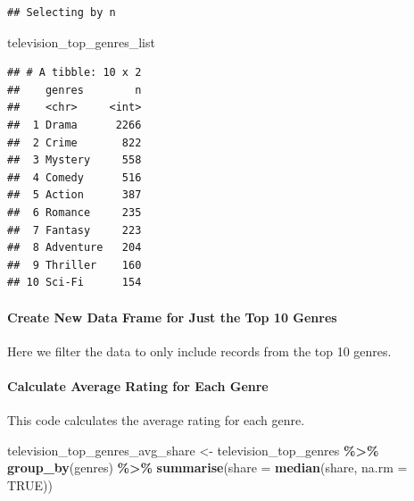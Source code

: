 \documentclass[
  b5paper]{book}
\newenvironment{Shaded}{\begin{snugshade}}{\end{snugshade}}
\newcommand{\AttributeTok}[1]{\textcolor[rgb]{0.13,0.29,0.53}{#1}}
\newcommand{\ConstantTok}[1]{\textcolor[rgb]{0.56,0.35,0.01}{#1}}
\newcommand{\FunctionTok}[1]{\textcolor[rgb]{0.13,0.29,0.53}{\textbf{#1}}}
\newcommand{\NormalTok}[1]{#1}
\newcommand{\OtherTok}[1]{\textcolor[rgb]{0.56,0.35,0.01}{#1}}
\newcommand{\SpecialCharTok}[1]{\textcolor[rgb]{0.81,0.36,0.00}{\textbf{#1}}}
\begin{document}
\begin{verbatim}
## Selecting by n
\end{verbatim}

\begin{Shaded}
\begin{Highlighting}[]
\NormalTok{television\_top\_genres\_list}
\end{Highlighting}
\end{Shaded}

\begin{verbatim}
## # A tibble: 10 x 2
##    genres        n
##    <chr>     <int>
##  1 Drama      2266
##  2 Crime       822
##  3 Mystery     558
##  4 Comedy      516
##  5 Action      387
##  6 Romance     235
##  7 Fantasy     223
##  8 Adventure   204
##  9 Thriller    160
## 10 Sci-Fi      154
\end{verbatim}

\hypertarget{create-new-data-frame-for-just-the-top-10-genres}{%
\paragraph*{Create New Data Frame for Just the Top 10 Genres}\label{create-new-data-frame-for-just-the-top-10-genres}}

Here we filter the data to only include records from the top 10 genres.

\begin{Shaded}
\end{Shaded}

\hypertarget{calculate-average-rating-for-each-genre}{%
\paragraph*{Calculate Average Rating for Each Genre}\label{calculate-average-rating-for-each-genre}}

This code calculates the average rating for each genre.

\begin{Shaded}
\begin{Highlighting}[]
\NormalTok{television\_top\_genres\_avg\_share }\OtherTok{\textless{}{-}}\NormalTok{ television\_top\_genres }\SpecialCharTok{\%\textgreater{}\%}
  \FunctionTok{group\_by}\NormalTok{(genres) }\SpecialCharTok{\%\textgreater{}\%}
  \FunctionTok{summarise}\NormalTok{(}\AttributeTok{share =} \FunctionTok{median}\NormalTok{(share, }\AttributeTok{na.rm =} \ConstantTok{TRUE}\NormalTok{))}
\end{Highlighting}
\end{Shaded}
\end{document}
